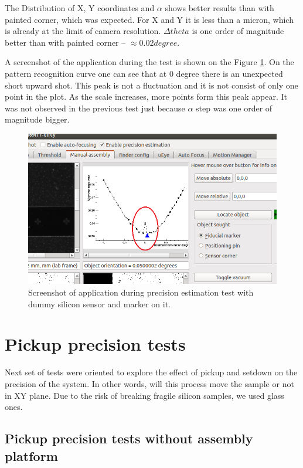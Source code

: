 The Distribution of X, Y coordinates and $\alpha$ shows better results than with painted corner, which was expected. For X and Y it is less than a micron, which is already at the limit of camera resolution. $\Delta theta$ is one order of magnitude better than with painted corner -- $\approx 0.02  degree$.

A screenshot of the application during the test is shown on the Figure \ref{fig:zero_peak}. On the pattern recognition curve one can see that at 0 degree there is an unexpected short upward shot. This peak is not a fluctuation and it is not consist of only one point in the plot. As the scale increases, more points form this peak appear. It was not observed in the previous test just because $\alpha$ step was one order of magnitude bigger.

\begin{figure}[ht]\centering
\includegraphics[width=0.8\linewidth]{Data/Precision_tests/Upward_shot.png}
\caption{Screenshot of application during precision estimation test with dummy silicon sensor and marker on it.}
\label{fig:zero_peak}
\end{figure}

\section{Pickup precision tests}

Next set of tests were oriented to explore the effect of pickup and setdown on the precision of the system. In other words, will this process move the sample or not in XY plane. Due to the risk of breaking fragile silicon samples, we used glass ones.

\subsection{Pickup precision tests without assembly platform}

